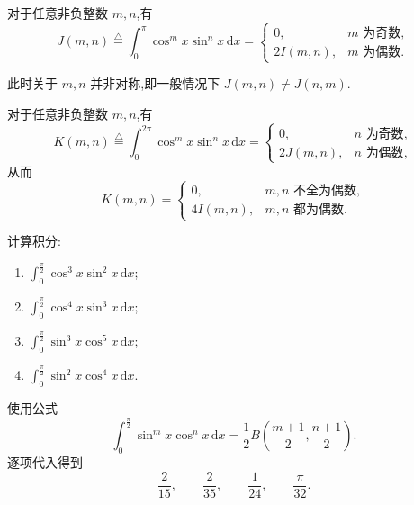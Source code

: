 \begin{proposition}[\markstar]
    对于任意非负整数 $m,n$,有
    \[
        J(m,n)\overset{\triangle}{=}
        \int_0^\pi\cos^m x\sin^n x\,\mathrm{d}x
        =\begin{cases}
            0,       & m\text{ 为奇数}, \\
            2I(m,n), & m\text{ 为偶数}.
        \end{cases}
    \]
\end{proposition}

\begin{remark}
    此时关于 $m,n$ 并非对称,即一般情况下 $J(m,n)\neq J(n,m)$.
\end{remark}

\begin{proposition}[\markstar]
    对于任意非负整数 $m,n$,有
    \[
        K(m,n)\overset{\triangle}{=}
        \int_0^{2\pi}\cos^m x\sin^n x\,\mathrm{d}x
        =\begin{cases}
            0,       & n\text{ 为奇数}, \\
            2J(m,n), & n\text{ 为偶数},
        \end{cases}
    \]
    从而
    \[
        K(m,n)=\begin{cases}
            0,       & m,n\text{ 不全为偶数}, \\
            4I(m,n), & m,n\text{ 都为偶数}.
        \end{cases}
    \]
\end{proposition}

\begin{example}
    计算积分:
    \begin{enumerate}
        \item $\displaystyle\int_0^{\frac{\pi}{2}}\cos^3x\sin^2x\,\mathrm{d}x$;
        \item $\displaystyle\int_0^{\frac{\pi}{2}}\cos^4x\sin^3x\,\mathrm{d}x$;
        \item $\displaystyle\int_0^{\frac{\pi}{2}}\sin^3x\cos^5x\,\mathrm{d}x$;
        \item $\displaystyle\int_0^{\frac{\pi}{2}}\sin^2x\cos^4x\,\mathrm{d}x$.
    \end{enumerate}
\end{example}
\exampleblank

\begin{solution}
    使用公式
    \[
        \displaystyle\int_0^{\frac{\pi}{2}}\sin^m x\cos^n x\,\mathrm{d}x
        =\dfrac{1}{2}B\left(\dfrac{m+1}{2},\dfrac{n+1}{2}\right).
    \]
    逐项代入得到
    \[
        \boxed{\dfrac{2}{15}},\qquad
        \boxed{\dfrac{2}{35}},\qquad
        \boxed{\dfrac{1}{24}},\qquad
        \boxed{\dfrac{\pi}{32}}.
    \]
\end{solution}

